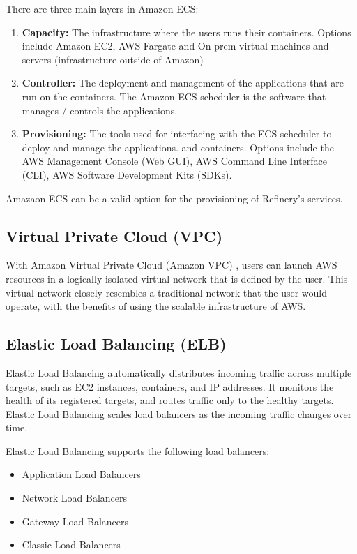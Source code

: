 		There are three main layers in Amazon ECS:
		\begin{enumerate}
			\item \textbf{Capacity:} The infrastructure where the users runs their containers. Options include Amazon EC2, 
			AWS Fargate and On-prem virtual machines and servers (infrastructure outside of Amazon) 
			\item \textbf{Controller:} The deployment and management of the applications that are run on the containers. The Amazon
			ECS scheduler is the software that manages / controls the applications.
			\item \textbf{Provisioning:} The tools used for interfacing with the ECS scheduler to deploy and manage the applications.
			and containers. Options include the AWS Management Console (Web GUI), AWS Command Line Interface (CLI), 
			AWS Software Development Kits (SDKs).
		\end{enumerate}

		Amazaon ECS can be a valid option for the provisioning of Refinery's services. 

	\subsection{Virtual Private Cloud (VPC)} \label{backgvpc}
		With Amazon Virtual Private Cloud (Amazon VPC) \cite{vpc}, users can launch AWS resources in a logically 
		isolated virtual network that is defined by the user. This virtual network closely resembles a traditional network 
		that the user would operate, with the benefits of using the scalable infrastructure of AWS.

	\subsection{Elastic Load Balancing (ELB)} \label{backgelb}
		Elastic Load Balancing \cite{elb} automatically distributes incoming traffic across multiple targets, 
		such as EC2 instances, containers, and IP addresses. 
		It monitors the health of its registered targets, and routes traffic only to the healthy targets. 
		Elastic Load Balancing scales load balancers as the incoming traffic changes over time. 

		Elastic Load Balancing supports the following load balancers: 
		\begin{itemize}
			\item Application Load Balancers
			\item Network Load Balancers
			\item Gateway Load Balancers
			\item Classic Load Balancers
		\end{itemize}

